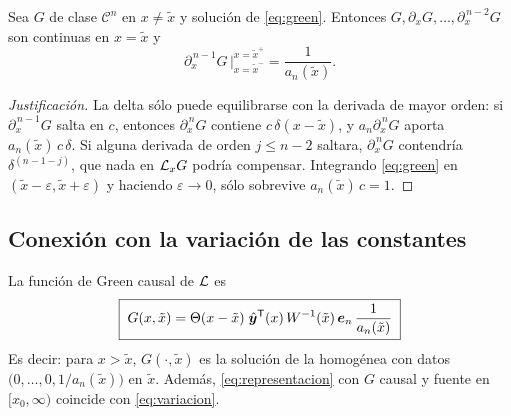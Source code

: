 \begin{proposicion}\label{prop:salto}
Sea $G$ de clase $\mathcal C^{n}$ en $x\neq\tilde x$ y solución de
\eqref{eq:green}. Entonces $G,\partial_xG,\dots,\partial_x^{\,n-2}G$ son
continuas en $x=\tilde x$ y
\begin{equation}\label{eq:salto}
  \partial_x^{\,n-1}G\,\Big|_{x=\tilde x^-}^{x=\tilde x^+}=\frac{1}{a_n(\tilde x)} .
\end{equation}
\end{proposicion}

\begin{proof}[Justificación]
La delta sólo puede equilibrarse con la derivada de mayor orden: si
$\partial_x^{\,n-1}G$ salta en $c$, entonces $\partial_x^{\,n}G$ contiene
$c\,\delta(x-\tilde x)$, y $a_n\partial_x^{\,n}G$ aporta
$a_n(\tilde x)\,c\,\delta$. Si alguna derivada de orden $j\le n-2$ saltara,
$\partial_x^{\,n}G$ contendría $\delta^{(n-1-j)}$, que nada en $\mathcal{L}_xG$
podría compensar. Integrando \eqref{eq:green} en
$(\tilde x-\varepsilon,\tilde x+\varepsilon)$ y haciendo $\varepsilon\to0$,
sólo sobrevive $a_n(\tilde x)\,c=1$.
\end{proof}



\subsection{Conexión con la variación de las constantes}\label{sec:conexion}

\begin{teorema}\label{teo:green-variacion}
La función de Green causal de $\mathcal{L}$ es
\begin{equation}\label{eq:green-causal}
  \boxed{\;G(x,\tilde x)=\Theta(x-\tilde x)\;\hat{\bm y}^{\mathsf{T}}(x)\,W^{-1}(\tilde x)\,\bm{e}_n\,\frac{1}{a_n(\tilde x)}\;}
\end{equation}
Es decir: para $x>\tilde x$, $G(\cdot,\tilde x)$ es la solución de la
homogénea con datos $\bigl(0,\dots,0,1/a_n(\tilde x)\bigr)$ en $\tilde x$.
Además, \eqref{eq:representacion} con $G$ causal y fuente en
$[x_0,\infty)$ coincide con \eqref{eq:variacion}.
\end{teorema}

